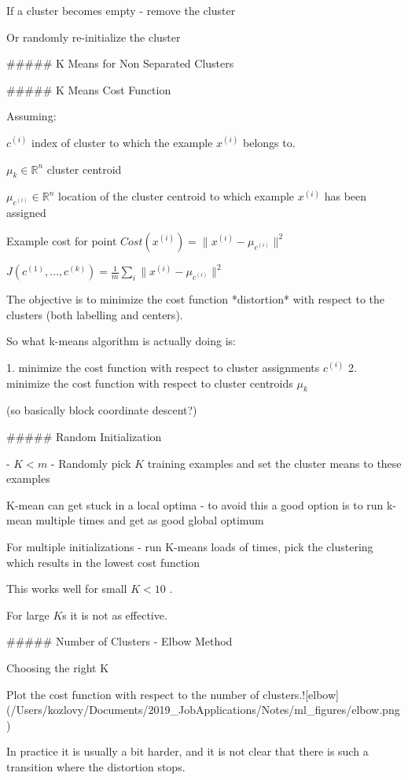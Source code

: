 If a cluster becomes empty - remove the cluster

Or randomly re-initialize the cluster

##### K Means for Non Separated Clusters

##### K Means Cost Function

Assuming: 

$c^{(i)}$ index of cluster to which the example $x^{(i)}$ belongs to.

$\mu_k \in \mathbb R ^n $ cluster centroid 

$\mu_{c^{(i)}} \in \mathbb R ^n $ location of the cluster centroid to which example $x^{(i)}$ has been assigned

Example cost for point $Cost(x^{(i)}) = \|x^{(i)} - \mu_{c^{(i)}} \|^2$ 

$J(c^{(1)},\dots, c^{(k)})= \frac{1}{m}\sum_i \|x^{(i)} - \mu_{c^{(i)}} \|^2 $

The objective is to minimize the cost function *distortion* with respect to the clusters (both labelling and centers).

So what k-means algorithm is actually doing is:

1. minimize the cost function with respect to cluster assignments $c^{(i)}$
2. minimize the cost function with respect to cluster centroids $\mu_k$ 

(so basically block coordinate descent?)

##### Random Initialization

- $K < m$
- Randomly pick $K$ training examples and set the cluster means to these examples

K-mean can get stuck in a local optima - to avoid this a good option is to run k-mean multiple times and get as good global optimum

For multiple initializations - run K-means loads of times, pick the clustering which results in the lowest cost function

This works well for small $K < 10$ .

For large $K$s it is not as effective.

##### Number of Clusters - Elbow Method

Choosing the right K 

Plot the cost function with respect to the number of clusters.![elbow](/Users/kozlovy/Documents/2019_JobApplications/Notes/ml_figures/elbow.png)



In practice it is usually a bit harder, and it is not clear that there is such a transition where the distortion stops.

